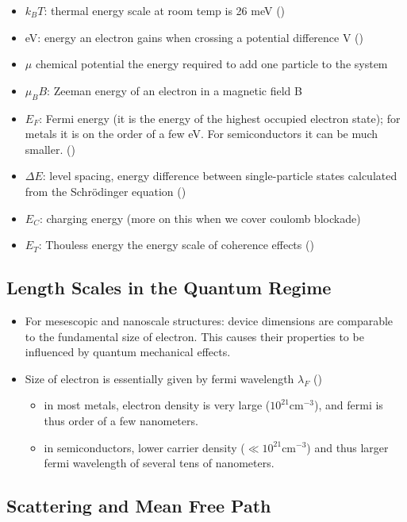 \begin{itemize}
    \item $k_B T$: thermal energy scale at room temp is 26 meV ()
    \item eV: energy an electron gains when crossing a potential difference V ()
    \item $\mu$ chemical potential the energy required to add one particle to the system
    \item $\mu_B B$: Zeeman energy of an electron in a magnetic field B
    \item $E_F$: Fermi energy (it is the energy of the highest occupied electron state); for metals it is on the order of a few eV. For semiconductors it can be much smaller. ()
    \item $\Delta E$: level spacing, energy difference between single-particle states calculated from the Schrödinger equation ()
    \item $E_C$: charging energy (more on this when we cover coulomb blockade)
    \item $E_T$: Thouless energy the energy scale of coherence effects ()
\end{itemize}

\subsection{Length Scales in the Quantum Regime}

\begin{itemize}
    \item For mesescopic and nanoscale structures: device dimensions are comparable to the fundamental size of electron. This causes their properties to be influenced by quantum mechanical effects.
    \item Size of electron is essentially given by fermi wavelength $\lambda_F$ ()
          \begin{itemize}
              \item in most metals, electron density is very large ($10^{21} \mathrm{cm}^{-3}$), and fermi is thus order of a few nanometers.
              \item in semiconductors, lower carrier density ($\ll 10^{21} \mathrm{cm}^{-3}$) and thus larger fermi wavelength of several tens of nanometers.
          \end{itemize}
\end{itemize}

\subsection{Scattering and Mean Free Path}

